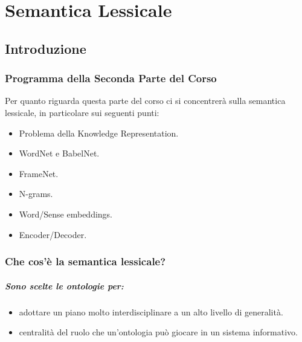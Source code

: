 \chapter{Semantica Lessicale}

\section{Introduzione}

\subsection{Programma della Seconda Parte del Corso}

Per quanto riguarda questa parte del corso ci si concentrerà sulla semantica lessicale, in particolare sui seguenti punti:

\begin{itemize}
  \item Problema della Knowledge Representation. 
  \item WordNet e BabelNet. 
  \item FrameNet. 
  \item N-grams. 
  \item Word/Sense embeddings. 
  \item Encoder/Decoder.
\end{itemize}

\subsection{Che cos'è la semantica lessicale?}


\paragraph{Sono scelte le ontologie per:}

\begin{itemize}
  \item {} adottare un piano molto interdisciplinare a un alto livello di generalità. 
  \item {} centralità del ruolo che un'ontologia può giocare in un sistema informativo.
\end{itemize}

